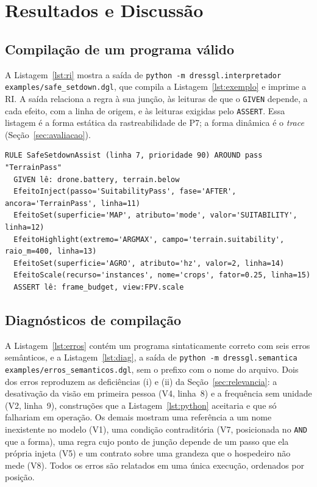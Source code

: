 \documentclass[conference]{IEEEtran}
\begin{document}
\section{Resultados e Discussão}
\label{sec:resultados-discussao}

\subsection{Compilação de um programa válido}
\label{sec:compilacao}

A Listagem~\ref{lst:ri} mostra a saída de
\texttt{python -m dressgl.\allowbreak interpretador examples/\allowbreak safe\_setdown.dgl}, que
compila a Listagem~\ref{lst:exemplo} e imprime a RI. A saída relaciona a regra
à sua junção, às leituras de que o \texttt{GIVEN} depende, a cada efeito, com a
linha de origem, e às leituras exigidas pelo \texttt{ASSERT}. Essa listagem é
a forma estática da rastreabilidade de P7; a forma dinâmica é o
\textit{trace} (Seção~\ref{sec:avaliacao}).

\begin{lstlisting}[style=saida,caption={Representação intermediária gerada para
a Listagem~\ref{lst:exemplo}.},label={lst:ri}]
RULE SafeSetdownAssist (linha 7, prioridade 90) AROUND pass "TerrainPass"
  GIVEN lê: drone.battery, terrain.below
  EfeitoInject(passo='SuitabilityPass', fase='AFTER', ancora='TerrainPass', linha=11)
  EfeitoSet(superficie='MAP', atributo='mode', valor='SUITABILITY', linha=12)
  EfeitoHighlight(extremo='ARGMAX', campo='terrain.suitability', raio_m=400, linha=13)
  EfeitoSet(superficie='AGRO', atributo='hz', valor=2, linha=14)
  EfeitoScale(recurso='instances', nome='crops', fator=0.25, linha=15)
  ASSERT lê: frame_budget, view:FPV.scale
\end{lstlisting}

\subsection{Diagnósticos de compilação}
\label{sec:diagnosticos}

A Listagem~\ref{lst:erros} contém um programa sintaticamente correto com seis
erros semânticos, e a Listagem~\ref{lst:diag}, a saída de
\texttt{python -m dressgl.\allowbreak semantica examples/\allowbreak erros\_semanticos.dgl}, sem o
prefixo com o nome do arquivo. Dois dos erros reproduzem as deficiências (i) e
(ii) da Seção~\ref{sec:relevancia}: a desativação da visão em primeira pessoa
(V4, linha~8) e a frequência sem unidade (V2, linha~9), construções que a
Listagem~\ref{lst:python} aceitaria e que só falhariam em operação. Os demais
mostram uma referência a um nome inexistente no modelo (V1), uma condição contraditória
(V7, posicionada no \texttt{AND} que a forma), uma regra cujo ponto de junção
depende de um passo que ela própria injeta (V5) e um contrato sobre uma grandeza
que o hospedeiro não mede (V8). Todos os erros são relatados em uma única
execução, ordenados por posição.
\end{document}
